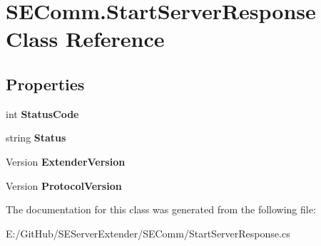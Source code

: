 \hypertarget{class_s_e_comm_1_1_start_server_response}{}\section{S\+E\+Comm.\+Start\+Server\+Response Class Reference}
\label{class_s_e_comm_1_1_start_server_response}
\subsection*{Properties}
\begin{DoxyCompactItemize}
\item 
\hypertarget{class_s_e_comm_1_1_start_server_response_a9534a42bbf60741ffa1f000d40fdddad}{}int {\bfseries Status\+Code}\label{class_s_e_comm_1_1_start_server_response_a9534a42bbf60741ffa1f000d40fdddad}

\item 
\hypertarget{class_s_e_comm_1_1_start_server_response_ad6ba10d746029e1cef6c091cd4eccc4c}{}string {\bfseries Status}\label{class_s_e_comm_1_1_start_server_response_ad6ba10d746029e1cef6c091cd4eccc4c}

\item 
\hypertarget{class_s_e_comm_1_1_start_server_response_a400d7deb68532171d9e639a1eca05169}{}Version {\bfseries Extender\+Version}\label{class_s_e_comm_1_1_start_server_response_a400d7deb68532171d9e639a1eca05169}

\item 
\hypertarget{class_s_e_comm_1_1_start_server_response_afae99d6c03c591bd657c9354d69ee631}{}Version {\bfseries Protocol\+Version}\label{class_s_e_comm_1_1_start_server_response_afae99d6c03c591bd657c9354d69ee631}

\end{DoxyCompactItemize}


The documentation for this class was generated from the following file\+:\begin{DoxyCompactItemize}
\item 
E\+:/\+Git\+Hub/\+S\+E\+Server\+Extender/\+S\+E\+Comm/Start\+Server\+Response.\+cs\end{DoxyCompactItemize}
